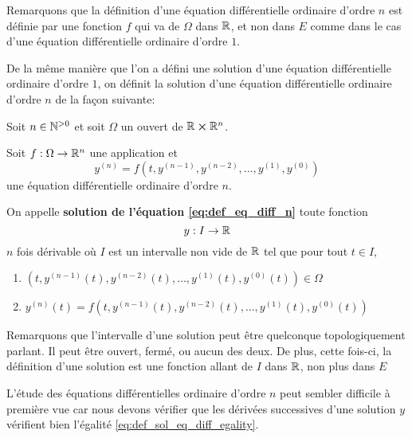 \documentclass[a4paper, 11pt]{report}
\begin{document}
	Remarquons que la définition d'une équation différentielle ordinaire
	d'ordre $n$ est définie par une fonction $f$ qui va de $\Omega$ dans
	$\mathbb{R}$, et non dans $E$ comme dans le cas d'une équation
	différentielle ordinaire d'ordre $1$.

	De la même manière que l'on a défini une solution d'une équation
	différentielle ordinaire d'ordre $1$, on définit la solution d'une équation
	différentielle ordinaire d'ordre $n$ de la façon suivante:

	\begin{definition} 
		Soit $n \in \mathbb{N}^{> 0}$ et soit $\Omega$ un ouvert de $\mathbb{R}
		\cross \mathbb{R}^{n}$.

		Soit $f : \Omega \rightarrow \mathbb{R}^{n}$ une application et
		\begin{equation}
			y^{(n)} = f(t, y^{(n - 1)}, y^{(n - 2)}, \dots, y^{(1)}, y^{(0)})
			\label{eq:def_eq_diff_n}
		\end{equation}
		une équation différentielle ordinaire d'ordre $n$.

		On appelle \textbf{solution de l'équation \ref{eq:def_eq_diff_n}} toute
		fonction
		\begin{equation}
			y : I \rightarrow \mathbb{R}
		\end{equation}
		$n$ fois dérivable où $I$ est un intervalle non vide de $\mathbb{R}$ tel que
		pour tout $t \in I$,
		\begin{enumerate}
			\item $(t, y^{(n - 1)}(t), y^{(n - 2)}(t), \dots, y^{(1)}(t),
				y^{(0)}(t)) \in \Omega$
				\label{eq:def_sol_eq_diff_set}
			\item $y^{(n)}(t) = f(t, y^{(n - 1)}(t), y^{(n - 2)}(t), \dots,
				y^{(1)}(t), y^{(0)}(t))$
				\label{eq:def_sol_eq_diff_egality}
		\end{enumerate}
	\end{definition}

	Remarquons que l'intervalle d'une solution peut être quelconque
	topologiquement parlant. Il peut être ouvert, fermé, ou aucun des deux. De
	plus, cette fois-ci, la définition d'une solution est une fonction allant de
	$I$ dans $\mathbb{R}$, non plus dans $E$

	L'étude des équations différentielles ordinaire d'ordre $n$ peut sembler
	difficile à première vue car nous devons vérifier que les dérivées
	successives d'une solution $y$ vérifient bien l'égalité
	\ref{eq:def_sol_eq_diff_egality}.
\end{document}
